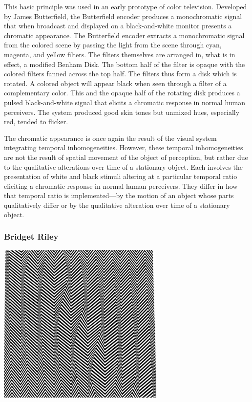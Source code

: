 This basic principle was used in an early prototype of color television. Developed by James Butterfield, the Butterfield encoder produces a monochromatic signal that when broadcast and displayed on a black-and-white monitor presents a chromatic appearance. The Butterfield encoder extracts a monochromatic signal from the colored scene by passing the light from the scene through cyan, magenta, and yellow filters. The filters themselves are arranged in, what is in effect, a modified Benham Disk. The bottom half of the filter is opaque with the colored filters fanned across the top half. The filters thus form a disk which is rotated. A colored object will appear black when seen through a filter of a complementary color. This and the opaque half of the rotating disk produces a pulsed black-and-white signal that elicits a chromatic response in normal human perceivers. The system produced good skin tones but unmixed hues, especially red, tended to flicker.

The chromatic appearance is once again the result of the visual system integrating temporal inhomogeneities. However, these temporal inhomogeneities are not the result of spatial movement of the object of perception, but rather due to the qualitative alterations over time of a stationary object. Each involves the presentation of white and black stimuli altering at a particular temporal ratio eliciting a chromatic response in normal human perceivers. They differ in how that temporal ratio is implemented---by the motion of an object whose parts qualitatively differ or by the qualitative alteration over time of a stationary object. \change

\begin{frame}[t]\frametitle{Bridget Riley}
	\begin{center}
		\includegraphics[height=8cm]{../../graphics/descending.jpg}
	\end{center}
\end{frame}

